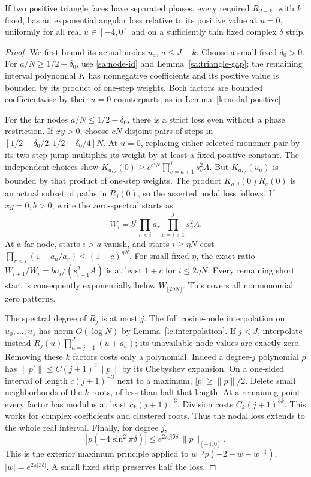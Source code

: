 \begin{lemma}\label{sa:cofactor-gap}
If two positive triangle faces have separated phases, every required
$R_{J-k}$, with $k$ fixed, has an exponential angular loss relative
to its positive value at $u=0$, uniformly for all real $u\in[-4,0]$
and on a sufficiently thin fixed complex $\delta$ strip.
\end{lemma}
\begin{proof}
We first bound its actual nodes $u_a$, $a\le J-k$. Choose a small
fixed $\delta_0>0$. For $a/N\ge1/2-\delta_0$, use
\eqref{sa:node-id} and Lemma~\ref{sa:triangle-gap}; the remaining
interval polynomial $K$ has nonnegative coefficients and its positive value is bounded
by its product of one-step weights. Both factors are bounded coefficientwise
by their $u=0$ counterparts, as in Lemma~\ref{lc:nodal-positive}.

For the far nodes $a/N\le1/2-\delta_0$, there is a strict loss even
without a phase restriction. If $xy>0$, choose $cN$ disjoint pairs
of steps in $[1/2-\delta_0/2,1/2-\delta_0/4]N$. At $u=0$, replacing
either selected monomer pair by its two-step jump multiplies its weight by
at least a fixed positive constant. The independent choices show
$K_{a,j}(0)\ge e^{c'N}\prod_{v=a+1}^j s_v^2A$.
But $K_{a,j}(u_a)$ is bounded by that product of one-step weights. The product
$K_{a,j}(0)R_a(0)$ is an actual subset of paths in $R_j(0)$,
so the asserted nodal loss follows.
If $xy=0,b>0$, write the zero-spectral starts as
\[
 W_i=b^i\prod_{r<i}a_r\prod_{v=i+1}^j s_v^2A.
\]
At a far node, starts $i>a$ vanish, and starts $i\ge\eta N$ cost
$\prod_{r<i}(1-a_a/a_r)\le(1-c)^{\eta N}$.
For small fixed $\eta$, the exact ratio
$W_{i+1}/W_i=ba_i/(s_{i+1}^2A)$ is at least $1+c$ for
$i\le2\eta N$. Every remaining short start is consequently
exponentially below $W_{\lfloor2\eta N\rfloor}$.
This covers all nonmonomial zero patterns.

The spectral degree of $R_j$ is at most $j$. The full cosine-node
interpolation on $u_0,\ldots,u_J$ has norm $O(\log N)$ by
Lemma~\ref{lc:interpolation}. If $j<J$, interpolate instead
$R_j(u)\prod_{a=j+1}^J(u+a_a)$; its unavailable node values are
exactly zero. Removing these $k$ factors costs only a polynomial.
Indeed a degree-$j$ polynomial $p$ has
$\|p'\|\le C(j+1)^3\|p\|$ by its Chebyshev expansion. On a
one-sided interval of length $c(j+1)^{-3}$ next to a maximum,
$|p|\ge\|p\|/2$. Delete small neighborhoods of the $k$ roots,
of less than half that length. At a remaining point every factor
has modulus at least $c_k(j+1)^{-3}$. Division costs
$C_k(j+1)^{3k}$. This works for complex coefficients and clustered roots.
Thus the nodal loss extends to the whole real interval. Finally,
for degree $j$,
\[
 |p(-4\sin^2\pi\delta)|\le
       e^{2\pi j|\Im\delta|}\|p\|_{[-4,0]}.
\]
This is the exterior maximum principle applied to
$w^{-j}p(-2-w-w^{-1})$, $|w|=e^{2\pi|\Im\delta|}$.
A small fixed strip preserves half the loss.
\end{proof}

